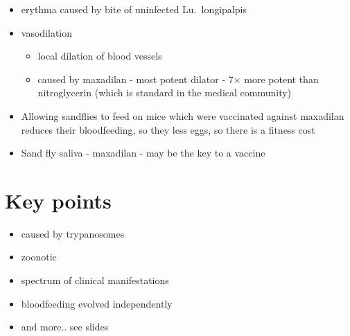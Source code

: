 \documentclass{article}
\begin{document}
\begin{itemize}
\begin{itemize}
        \end{itemize}
        \item erythma caused by bite of uninfected Lu.~longipalpis
        \item vasodilation
        \begin{itemize}
            \item local dilation of blood vessels
            \item caused by maxadilan - most potent dilator - 7$\times$ more potent than nitroglycerin (which is standard in the medical community)
        \end{itemize}
        \item Allowing sandflies to feed on mice which were vaccinated against maxadilan reduces their bloodfeeding, so they less eggs, so there is a fitness cost
        \item Sand fly saliva - maxadilan - may be the key to a vaccine
    \end{itemize}

    \section{Key points}
    \begin{itemize}
        \item caused by trypanosomes
        \item zoonotic
        \item spectrum of clinical manifestations
        \item bloodfeeding evolved independently
        \item and more.. see slides
    \end{itemize}
\end{document}
